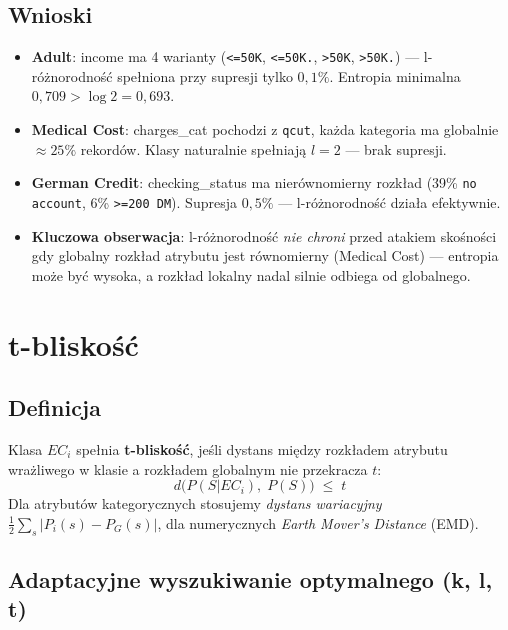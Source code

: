 \documentclass[12pt,a4paper]{article}
\begin{document}
\subsection{Wnioski}

\begin{itemize}
    \item \textbf{Adult}: income ma 4 warianty (\texttt{<=50K},
          \texttt{<=50K.}, \texttt{>50K}, \texttt{>50K.}) ---
          l-różnorodność spełniona przy supresji tylko $0{,}1\%$.
          Entropia minimalna $0{,}709 > \log 2 = 0{,}693$.

    \item \textbf{Medical Cost}: charges\_cat pochodzi z \texttt{qcut},
          każda kategoria ma globalnie $\approx 25\%$ rekordów.
          Klasy naturalnie spełniają $l=2$ --- brak supresji.

    \item \textbf{German Credit}: checking\_status ma nierównomierny rozkład
          (39\% \texttt{no account}, 6\% \texttt{>=200 DM}).
          Supresja $0{,}5\%$ --- l-różnorodność działa efektywnie.

    \item \textbf{Kluczowa obserwacja}: l-różnorodność \emph{nie chroni}
          przed atakiem skośności gdy globalny rozkład atrybutu jest
          równomierny (Medical Cost) --- entropia może być wysoka,
          a rozkład lokalny nadal silnie odbiega od globalnego.
\end{itemize}

\section{t-bliskość}

\subsection{Definicja}

Klasa $EC_i$ spełnia \textbf{t-bliskość}, jeśli dystans między rozkładem
atrybutu wrażliwego w klasie a rozkładem globalnym nie przekracza $t$:
\[
    d\bigl(P(S|EC_i),\; P(S)\bigr) \;\leq\; t
\]
Dla atrybutów kategorycznych stosujemy \emph{dystans wariacyjny}
$\frac{1}{2}\sum_s |P_i(s) - P_G(s)|$,
dla numerycznych \emph{Earth Mover's Distance} (EMD).

\subsection{Adaptacyjne wyszukiwanie optymalnego (k, l, t)}
\end{document}
